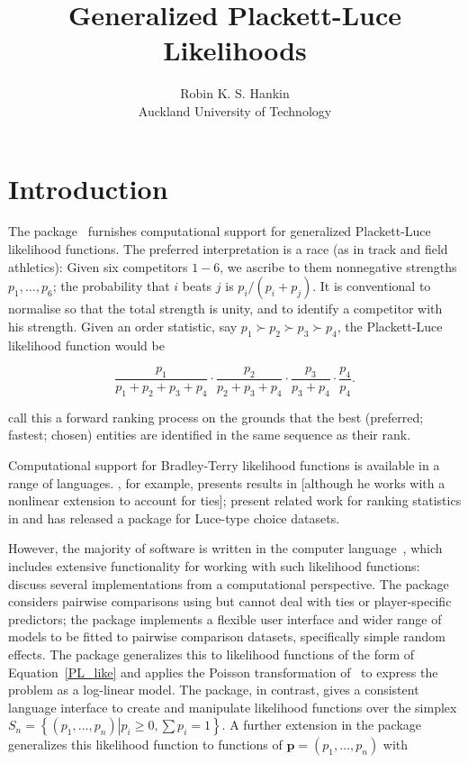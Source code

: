 \documentclass[article]{jss}
\author{Robin K. S. Hankin\\Auckland University of Technology}
\title{Generalized Plackett-Luce Likelihoods}
\begin{document}
\section{Introduction}

The  package~\citep{hankin2009,hankin2017} furnishes
computational support for generalized
Plackett-Luce~\citep{plackett1975} likelihood functions.  The
preferred interpretation is a race (as in track and field athletics):
Given six competitors $1-6$, we ascribe to them nonnegative strengths
$p_1,\ldots, p_6$; the probability that $i$ beats $j$ is
$p_i/(p_i+p_j)$.  It is conventional to normalise so that the total
strength is unity, and to identify a competitor with his strength.
Given an order statistic, say $p_1\succ p_2\succ p_3\succ p_4$, the
Plackett-Luce likelihood function would be

\begin{equation}\label{PL_like}
  \frac{p_1}{p_1+p_2+p_3+p_4}\cdot
  \frac{p_2}{    p_2+p_3+p_4}\cdot
  \frac{p_3}{        p_3+p_4}\cdot
  \frac{p_4}{            p_4}.
\end{equation}


\citet{mollica2014} call this a forward ranking process on the grounds
that the best (preferred; fastest; chosen) entities are identified in
the same sequence as their rank.  

Computational support for Bradley-Terry likelihood functions is
available in a range of languages.  \cite{hunter2004}, for example,
presents results in  [although he works with a
nonlinear extension to account for ties]; \cite{allison1994} present
related work for ranking statistics in  and
\cite{maystre2022} has released a  package for
Luce-type choice datasets.

However, the majority of software is written in the 
computer language~\citep{rcore2023}, which includes extensive
functionality for working with such likelihood functions:
\cite{turner2020} discuss several implementations from a computational
perspective.  The  package \citep{firth2005}
considers pairwise comparisons using  but cannot deal
with ties or player-specific predictors; the 
package \citep{turner2012} implements a flexible user interface and
wider range of models to be fitted to pairwise comparison datasets,
specifically simple random effects.  The  package
\citep{turner2020} generalizes this to likelihood functions of the
form of Equation~\ref{PL_like} and applies the Poisson transformation
of~\cite{baker1994} to express the problem as a log-linear model.  The
 package, in contrast, gives a consistent language
interface to create and manipulate likelihood functions over the
simplex ${S}_n=\left\lbrace\left(p_1,\ldots,p_n\right)\left|p_i\geq
0,\sum p_i=1\right.\right\rbrace$.  A further extension in the package
generalizes this likelihood function to functions of ${\mathbf
p}=(p_1,\ldots,p_n)$ with
\end{document}

